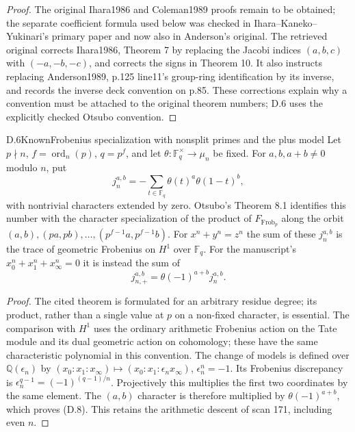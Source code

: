 \begin{proof}
The original Ihara1986 and Coleman1989 proofs remain to be obtained; the separate coefficient formula used below was checked in Ihara--Kaneko--Yukinari's primary paper and now also in Anderson's original. The retrieved original \cite[Supplement]{dIhara2000} corrects Ihara1986, Theorem 7 by replacing the Jacobi indices $(a,b,c)$ with $(-a,-b,-c)$, and corrects the signs in Theorem 10. It also instructs replacing Anderson1989, p.125 line11's group-ring identification by its inverse, and records the inverse deck convention on p.85. These corrections explain why a convention must be attached to the original theorem numbers; D.6 uses the explicitly checked Otsubo convention.
\end{proof}

\begin{statement}{D.6}{Known}{Frobenius specialization with nonsplit primes and the plus model}
Let $p\nmid n$, $f=\operatorname{ord}_n(p)$, $q=p^f$, and let $\theta:\mathbb F_q^\times\to\mu_n$ be fixed. For $a,b,a+b\ne0$ modulo $n$, put
\[
 j_n^{a,b}=-\sum_{t\in\mathbb F_q}\theta(t)^a\theta(1-t)^b,
\]
with nontrivial characters extended by zero. Otsubo's Theorem 8.1 identifies this number with the character specialization of the product of $F_{\operatorname{Frob}_p}$ along the orbit
$(a,b),(pa,pb),\ldots,(p^{f-1}a,p^{f-1}b)$. For $x^n+y^n=z^n$ the sum of these $j_n^{a,b}$ is the trace of geometric Frobenius on $H^1$ over $\mathbb F_q$. For the manuscript's $x_0^n+x_1^n+x_\infty^n=0$ it is instead the sum of
\[
 j_{n,+}^{a,b}=\theta(-1)^{a+b}j_n^{a,b}.                    \tag{D.8}
\]
\end{statement}
\begin{proof}
The cited theorem \cite[Theorem 8.1]{Otsubo2016} is formulated for an arbitrary residue degree; its product, rather than a single value at $p$ on a non-fixed character, is essential. The comparison with $H^1$ uses the ordinary arithmetic Frobenius action on the Tate module and its dual geometric action on cohomology; these have the same characteristic polynomial in this convention. The change of models is defined over $\mathbb Q(\epsilon_n)$ by
$(x_0:x_1:x_\infty)\mapsto(x_0:x_1:\epsilon_n x_\infty)$, $\epsilon_n^n=-1$. Its Frobenius discrepancy is $\epsilon_n^{q-1}=(-1)^{(q-1)/n}$. Projectively this multiplies the first two coordinates by the same element. The $(a,b)$ character is therefore multiplied by $\theta(-1)^{a+b}$, which proves (D.8). This retains the arithmetic descent of scan 171, including even $n$.
\end{proof}

